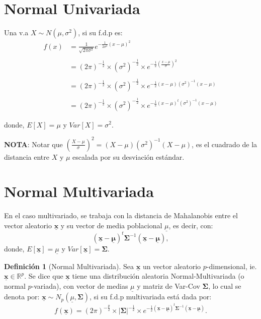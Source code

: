 \documentclass[
]{book}
\theoremstyle{definition}
\newtheorem{definition}{Definición}[chapter]
\theoremstyle{definition}
\theoremstyle{definition}
\theoremstyle{definition}
\theoremstyle{remark}
\begin{document}
\hypertarget{normal-univariada}{%
\section{Normal Univariada}\label{normal-univariada}}

Una v.a \(X\sim N(\mu,\sigma^2)\), si su f.d.p es:
\begin{align*}
f(x)&=\frac{1}{\sqrt{2\pi\sigma^2}}e^{-\frac{1}{2\sigma^2}(x-\mu)^2}\\ \\
&=(2\pi)^{-\frac{1}{2}}\times (\sigma^2)^{-\frac{1}{2}}\times e^{-\frac{1}{2}\left(\frac{ x-\mu}{\sigma}\right)^2}\\ 
\\
&=(2\pi)^{-\frac{1}{2}}\times (\sigma^2)^{-\frac{1}{2}}\times e^{-\frac{1}{2}(x-\mu)(\sigma^2)^{-1}(x-\mu)}\\ \\ 
&=(2\pi)^{-\frac{1}{2}}\times (\sigma^2)^{-\frac{1}{2}}\times e^{-\frac{1}{2}(x-\mu)^t(\sigma^2)^{-1}(x-\mu)}
\end{align*}

donde, \(E[X]=\mu\) y \(Var[X]=\sigma^2\).

\textbf{NOTA}: Notar que \(\left(\frac{ X-\mu}{\sigma}\right)^2=(X-\mu)(\sigma^2)^{-1}(X-\mu)\), es el cuadrado de la distancia entre \(X\) y \(\mu\) escalada por su desviación estándar.

\hypertarget{normal-multivariada}{%
\section{Normal Multivariada}\label{normal-multivariada}}

En el caso multivariado, se trabaja con la distancia de Mahalanobis entre el vector aleatorio \(\underline{\mathbf{x}}\) y su vector de media poblacional \(\underline{\mu}\), es decir, con:
\[
(\underline{\mathbf{x}}-\underline{\mathbf{\mu}})^t\mathbf{\Sigma}^{-1}(\underline{\mathbf{x}}-\underline{\mathbf{\mu}}),
\]
donde, \(E[\underline{\mathbf{x}}]=\underline{\mu}\) y \(Var[\underline{\mathbf{x}}]=\mathbf{\Sigma}\).

\begin{definition}[Normal Multivariada]
\protect\hypertarget{def:normal-multiv}{}\label{def:normal-multiv}Sea \(\underline{\mathbf{x}}\) un vector aleatorio \(p\)-dimensional, ie.
\(\underline{\mathbf{x}}\in \mathbb{R}^p\). Se dice que \(\underline{\mathbf{x}}\) tiene una distribución aleatoria Normal-Multivariada (o normal \(p\)-variada), con vector de medias \(\underline{\mu}\) y matriz de Var-Cov \(\mathbf{\Sigma}\), lo cual se denota por:
\(\underline{\mathbf{x}} \sim N_p (\underline{\mu}, \mathbf{\Sigma})\), si su f.d.p multivariada está dada por:
\[
f(\underline{\mathbf{x}})=(2\pi)^{-\frac{p}{2}}\times |\mathbf{\Sigma}|^{-\frac{1}{2}}\times e^{-\frac{1}{2}(\underline{\mathbf{x}}-\underline{\mathbf{\mu}})^t\mathbf{\Sigma}^{-1}(\underline{\mathbf{x}}-\underline{\mathbf{\mu}})}.
\]
\end{definition}
\end{document}
